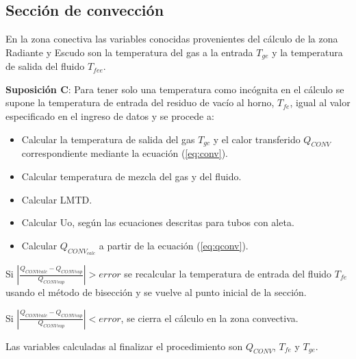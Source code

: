 \subsection{Sección de convección}
\par En la zona conectiva las variables conocidas provenientes del cálculo de la zona Radiante y Escudo son la temperatura del gas a la entrada $T_{ge}$ y la temperatura de salida del fluido $T_{fee}$.
\par \textbf{Suposición C}: Para tener solo una temperatura como incógnita en el cálculo se supone la temperatura de entrada del residuo de vacío al horno, $T_{fe}$, igual al valor especificado en el ingreso de datos y se procede a:
\begin{itemize}
\item Calcular la temperatura de salida del gas $T_{gc}$ y el calor transferido $Q_{CONV}$ correspondiente mediante la ecuación (\ref{eq:conv}).
\item Calcular temperatura de mezcla del gas y del fluido.
\item Calcular LMTD.
\item Calcular Uo, según las ecuaciones descritas para tubos con aleta.
\item Calcular $Q_{CONV_{calc}}$ a partir de la ecuación (\ref{eq:qconv}).
\end{itemize}
\par Si $|\frac{Q_{CONVcalc} - Q_{CONVsup}}{Q_{CONVsup}} | > error$ se recalcular la temperatura de entrada del fluido $T_{fe}$ usando el método de bisección y se vuelve al punto inicial de la sección.
\par Si $|\frac{Q_{CONVcalc} - Q_{CONVsup}}{Q_{CONVsup}} | < error$, se cierra el cálculo en la zona convectiva.
\par Las variables calculadas al finalizar el procedimiento son  $Q_{CONV}$, $T_{fe}$ y $T_{ge}$.

